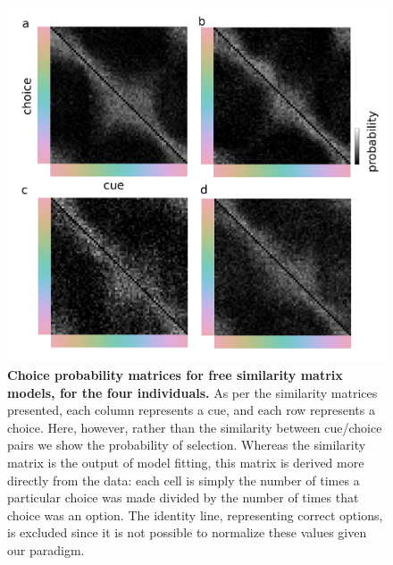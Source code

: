 \begin{figure}
    \centering
    \begin{fullwidth}
    \includegraphics[width=\textwidth+4cm]{../Figures/flat/SI6_choiceMatrices.jpg}
    \caption{\textbf{Choice probability matrices for free similarity matrix models, for the four individuals.}
    As per the similarity matrices presented, each column represents a cue, and each row represents a choice. 
    Here, however, rather than the similarity between cue/choice pairs we show the probability of selection. 
    Whereas the similarity matrix is the output of model fitting, this matrix is derived more directly from the data: each cell is simply the number of times a particular choice was made divided by the number of times that choice was an option. 
    The identity line, representing correct options, is excluded since it is not possible to normalize these values given our paradigm.
    } 
    \label{fig:choiceProbabilityMatrices}
    \end{fullwidth}
\end{figure}

